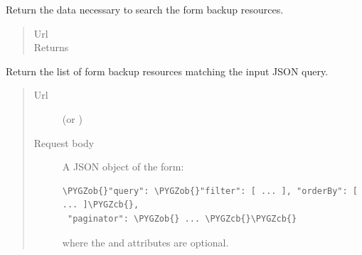 \documentclass[letterpaper,10pt,english]{sphinxmanual}
\def\PYGZob{\char`\{}
\def\PYGZcb{\char`\}}
\begin{document}
\begin{fulllineitems}
\begin{fulllineitems}
\end{fulllineitems}


\begin{fulllineitems}
\label{api:onlinelinguisticdatabase.controllers.formbackups.FormbackupsController.new_search}
Return the data necessary to search the form backup resources.
\begin{quote}\begin{description}
\item[{Url }] \leavevmode
{}

\item[{Returns}] \leavevmode
{}

\end{description}\end{quote}

\end{fulllineitems}


\begin{fulllineitems}
\label{api:onlinelinguisticdatabase.controllers.formbackups.FormbackupsController.search}
Return the list of form backup resources matching the input
JSON query.
\begin{quote}\begin{description}
\item[{Url }] \leavevmode
{} (or )

\item[{Request body}] \leavevmode
A JSON object of the form:

\begin{Verbatim}[commandchars=\\\{\}]
\PYGZob{}"query": \PYGZob{}"filter": [ ... ], "orderBy": [ ... ]\PYGZcb{},
 "paginator": \PYGZob{} ... \PYGZcb{}\PYGZcb{}
\end{Verbatim}

where the  and  attributes are optional.

\end{description}\end{quote}


\end{fulllineitems}
\end{fulllineitems}
\end{document}
